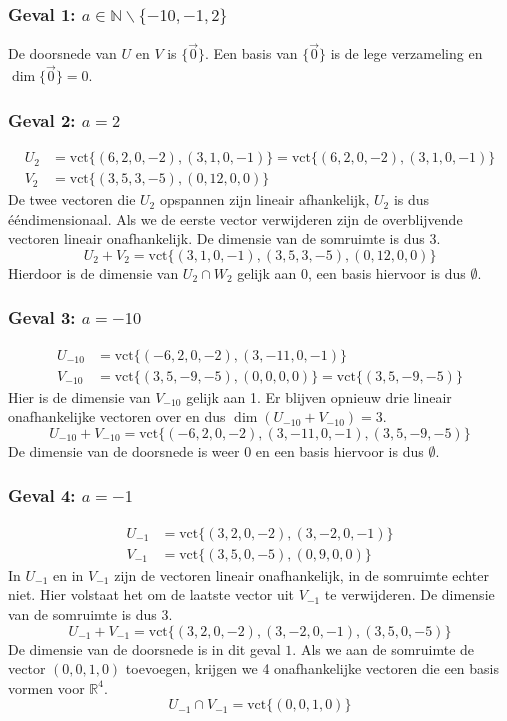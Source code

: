 \documentclass[lineaire_algebra_oplossingen.tex]{subfiles}
\begin{document}
\subsubsection*{Geval 1: $a \in \mathbb{N}\backslash\{-10,-1,2\}$}
De doorsnede van $U$ en $V$ is $\{\vec{0}\}$. Een basis van $\{\vec{0}\}$ is de lege verzameling en $\dim\{\vec{0}\}=0$.

\subsubsection*{Geval 2: $a = 2$}
\begin{align*}
U_2 &= \text{vct}\{(6,2,0,-2),(3,1,0,-1)\} = \text{vct}\{(6,2,0,-2),(3,1,0,-1)\}\\
V_2 &= \text{vct}\{(3,5,3,-5),(0,12,0,0)\}
\end{align*}
De twee vectoren die $U_2$ opspannen zijn lineair afhankelijk, $U_2$ is dus \'e\'endimensionaal. Als we de eerste vector verwijderen zijn de overblijvende vectoren lineair onafhankelijk. De dimensie van de somruimte is dus $3$.
\[
U_2+V_2 = \text{vct}\{(3,1,0,-1),(3,5,3,-5),(0,12,0,0)\}
\]
Hierdoor is de dimensie van $U_2 \cap W_2$ gelijk aan 0, een basis hiervoor is dus $\emptyset$.

\subsubsection*{Geval 3: $a=-10$}
\begin{align*}
U_{-10} &= \text{vct}\{(-6,2,0,-2),(3,-11,0,-1)\} \\
V_{-10} &= \text{vct}\{(3,5,-9,-5),(0,0,0,0)\} = \text{vct}\{(3,5,-9,-5)\}
\end{align*}
Hier is de dimensie van $V_{-10}$ gelijk aan 1. Er blijven opnieuw drie lineair onafhankelijke vectoren over en dus $\dim(U_{-10}+V_{-10})=3$.
\[
U_{-10}+V_{-10} = \text{vct}\{(-6,2,0,-2),(3,-11,0,-1),(3,5,-9,-5)\}
\]
De dimensie van de doorsnede is weer $0$ en een basis hiervoor is dus $\emptyset$.
\subsubsection*{Geval 4: $a=-1$}
\begin{align*}
U_{-1} &= \text{vct}\{(3,2,0,-2),(3,-2,0,-1)\} \\
V_{-1} &= \text{vct}\{(3,5,0,-5),(0,9,0,0)\}
\end{align*}
In $U_{-1}$ en in $V_{-1}$ zijn de vectoren lineair onafhankelijk, in de somruimte echter niet. Hier volstaat het om de laatste vector uit $V_{-1}$ te verwijderen. De dimensie van de somruimte is dus 3.
\[
U_{-1}+V_{-1} = \text{vct}\{(3,2,0,-2),(3,-2,0,-1),(3,5,0,-5)\}
\]
De dimensie van de doorsnede is in dit geval $1$. Als we aan de somruimte de vector $(0,0,1,0)$ toevoegen, krijgen we 4 onafhankelijke vectoren die een basis vormen voor $\mathbb{R}^4$.
\[
U_{-1} \cap V_{-1} = \text{vct}\{(0,0,1,0)\}
\]
\end{document}
